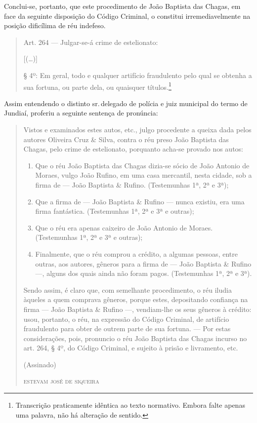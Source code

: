 Conclui-se, portanto, que este procedimento de João Baptista das Chagas,
em face da seguinte disposição do Código Criminal, o constitui
irremediavelmente na posição dificílima de réu indefeso.

\begin{quote}
Art. 264 --- Julgar-se-á crime de estelionato:

{[}(\ldots{}){]}

§ 4º: Em geral, todo e qualquer artifício fraudulento pelo qual se
obtenha a sua fortuna, ou parte dela, ou quaisquer títulos.\footnote{Transcrição
  praticamente idêntica ao texto normativo. Embora falte apenas uma
  palavra, não há alteração de sentido.}
\end{quote}

Assim entendendo o distinto sr.\,delegado de polícia e juiz municipal do
termo de Jundiaí, proferiu a seguinte sentença de pronúncia:

\begin{quote}
Vistos e examinados estes autos, etc., julgo procedente a queixa dada
pelos autores Oliveira Cruz \& Silva, contra o réu preso João Baptista
das Chagas, pelo crime de estelionato, porquanto acha-se provado nos
autos:

\begin{enumerate}[label=\arabic*º]
\item Que o réu João Baptista das Chagas dizia-se sócio de João Antonio de
Moraes, vulgo João Rufino, em uma casa mercantil, nesta cidade, sob a
firma de --- João Baptista \& Rufino. (Testemunhas 1ª, 2ª e 3ª);

\item Que a firma de --- João Baptista \& Rufino --- nunca existiu, era uma
firma fantástica. (Testemunhas 1ª, 2ª e 3ª e outras);

\item Que o réu era apenas caixeiro de João Antonio de Moraes.
(Testemunhas 1ª, 2ª e 3ª e outras);

\item Finalmente, que o réu comprou a crédito, a algumas pessoas, entre
outras, aos autores, gêneros para a firma de --- João Baptista \& Rufino
---, alguns dos quais ainda não foram pagos. (Testemunhas 1ª, 2ª e 3ª).
\end{enumerate}

Sendo assim, é claro que, com semelhante procedimento, o réu iludia
àqueles a quem comprava gêneros, porque estes, depositando confiança na
firma --- João Baptista \& Rufino ---, vendiam-lhe os seus gêneros à
crédito: usou, portanto, o réu, na expressão do Código Criminal, de
artifício fraudulento para obter de outrem parte de sua fortuna. --- Por
estas considerações, pois, pronuncio o réu João Baptista das Chagas
incurso no art. 264, § 4º, do Código Criminal, e sujeito à prisão e
livramento, etc.

\begin{flushright}
(Assinado)

\textsc{estevam josé de siqueira}
\end{flushright}
\end{quote}

